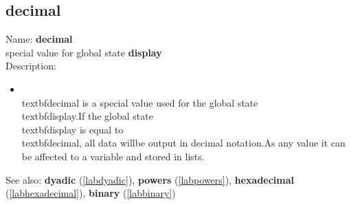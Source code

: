 \subsection{decimal}
\label{labdecimal}
\noindent Name: \textbf{decimal}\\
special value for global state \textbf{display}\\
\noindent Description: \begin{itemize}

\item \\textbf{decimal} is a special value used for the global state \\textbf{display}.\n   If the global state \\textbf{display} is equal to \\textbf{decimal}, all data will\n   be output in decimal notation.\n    \n   As any value it can be affected to a variable and stored in lists.\n\end{itemize}
See also: \textbf{dyadic} (\ref{labdyadic}), \textbf{powers} (\ref{labpowers}), \textbf{hexadecimal} (\ref{labhexadecimal}), \textbf{binary} (\ref{labbinary})
